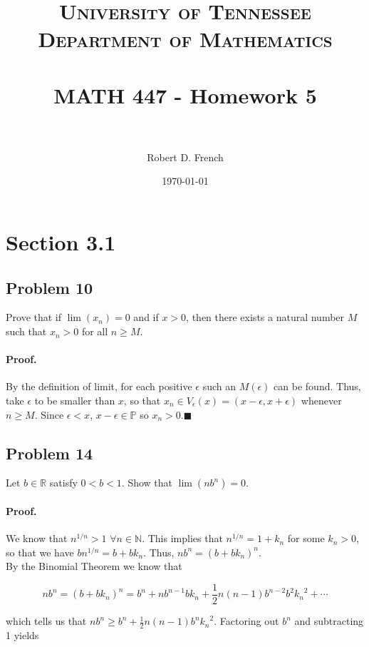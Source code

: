\documentclass[paper=a4, fontsize=11pt]{scrartcl} %
\title{	
\normalfont \normalsize 
\textsc{University of Tennessee \\ Department of Mathematics} \\ [25pt] %
\horrule{0.5pt} \\[0.4cm] %
\huge MATH 447 - Homework 5 \\ %
\horrule{2pt} \\[0.5cm] %
}
\author{Robert D. French} %
\date{\normalsize\today} %
\numberwithin{equation}{section} %
\numberwithin{figure}{section} %
\numberwithin{table}{section} %
\begin{document}
\maketitle %


\section*{Section 3.1}

\newcommand{\prob}[1]{\subsection*{Problem {#1}}}
\newcommand{\subprob}[1]{\subsubsection*{{#1}}}
\newcommand{\pf}{\paragraph{Proof.}}
\newcommand{\done}{$\blacksquare$}

\prob{10} Prove that if $\lim(x_n) = 0$ and if $x > 0$, then there exists a natural number $M$ such that $x_n > 0$ for all $n \geq M$.

\pf By the definition of limit, for each positive $\epsilon$ such an $M(\epsilon)$ can be found. Thus, take $\epsilon$ to be smaller than $x$, so that $x_n \in V_\epsilon (x) = (x - \epsilon, x + \epsilon)$ whenever $n \geq M$. Since $\epsilon < x$, $x - \epsilon \in \mathbb{P}$ so $x_n > 0$.\done

\newcommand{\nin}{n \in \mathbb{N}}
\newcommand{\fanin}{\forall n \in \mathbb{N}}
\prob{14} Let $b \in \mathbb{R}$ satisfy $0 < b < 1$. Show that $\lim(nb^n) = 0$.

\pf We know that $n^{1/n} > 1$ $\fanin$. This implies that $n^{1/n} = 1 + k_n$ for some $k_n > 0$, so that we have $bn^{1/n} = b + b k_n$. Thus, $nb^n = (b + b k_n)^n$.\\

By the Binomial Theorem we know that 

\begin{equation*}
nb^n = (b + b k_n)^n = b^n + n b^{n-1} b k_n + \frac{1}{2} n (n - 1) b^{n - 2} b^2 {k_n}^2 + \cdots
\end{equation*}

which tells us that $nb^n \geq b^n + \frac{1}{2} n (n-1) b^n {k_n}^2$. Factoring out $b^n$ and subtracting 1 yields
\end{document}
